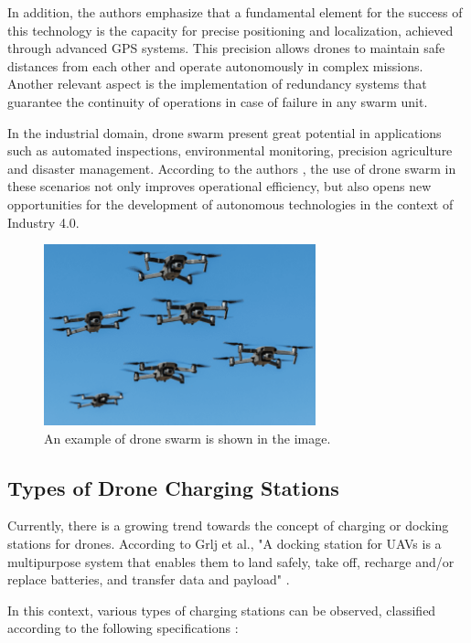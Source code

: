 In addition, the authors \cite{swarming_drones} emphasize that a fundamental element for the success of this technology is the capacity for precise positioning and localization, achieved through advanced GPS systems. This precision allows drones to maintain safe distances from each other and operate autonomously in complex missions. Another relevant aspect is the implementation of redundancy systems that guarantee the continuity of operations in case of failure in any swarm unit.

In the industrial domain, drone swarm present great potential in applications such as automated inspections, environmental monitoring, precision agriculture and disaster management. According to the authors \cite{swarming_drones}, the use of drone swarm in these scenarios not only improves operational efficiency, but also opens new opportunities for the development of autonomous technologies in the context of Industry 4.0.

\begin{figure}[H]
    \centering
    \includegraphics[width=0.7\textwidth]{pictures/swarms.png}
    \caption{An example of drone swarm is shown in the image. \cite{swarming_drones}}
    \label{fig:swarming_drones_2}
\end{figure}

\subsection{Types of Drone Charging Stations}

    Currently, there is a growing trend towards the concept of charging or docking stations for drones. According to Grlj et al., "A docking station for UAVs is a multipurpose system that enables them to land safely, take off, recharge and/or replace batteries, and transfer data and payload" \cite{grlj_docking_stations}.

    In this context, various types of charging stations can be observed, classified according to the following specifications \cite{grlj_docking_stations}:

